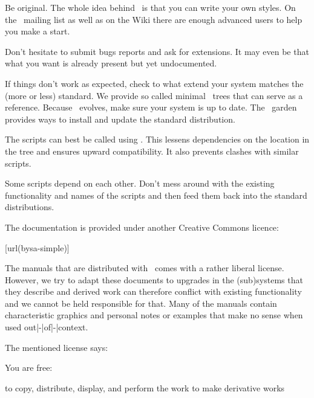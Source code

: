 \startitem
    Be original. The whole idea behind \CONTEXT\ is that you can write your own
    styles. On the \CONTEXT\ mailing list as well as on the Wiki there are enough
    advanced users to help you make a start.
\stopitem

\startitem
    Don't hesitate to submit bugs reports and ask for extensions. It may even be
    that what you want is already present but yet undocumented.
\stopitem

\startitem
    If things don't work as expected, check to what extend your system matches
    the (more or less) standard. We provide so called minimal \CONTEXT\ trees
    that can serve as a reference. Because \CONTEXT\ evolves, make sure your
    system is up to date. The \CONTEXT\ garden provides ways to install and
    update the standard distribution.
\stopitem

\startitem
    The scripts can best be called using . This lessens dependencies
    on the location in the tree and ensures upward compatibility. It also prevents
    clashes with similar scripts.
\stopitem

\startitem
    Some scripts depend on each other. Don't mess around with the existing
    functionality and names of the scripts and then feed them back into the
    standard distributions.
\stopitem

\stopitemize

\stopsubject

\startsubject[title={Documents}]

The documentation is provided under another Creative Commons licence:

\startnarrower
    [url(bysa-simple)]
\stopnarrower

The manuals that are distributed with \CONTEXT\ comes with a rather liberal
license. However, we try to adapt these documents to upgrades in the (sub)systems
that they describe and derived work can therefore conflict with existing
functionality and we cannot be held responsible for that. Many of the manuals
contain characteristic graphics and personal notes or examples that make no sense
when used out|-|of|-|context.

The mentioned license says:

\startcolor[blue]
You are free:

\startitemize
    \startitem to copy, distribute, display, and perform the work \stopitem
    \startitem to make derivative works \stopitem
\stopitemize

